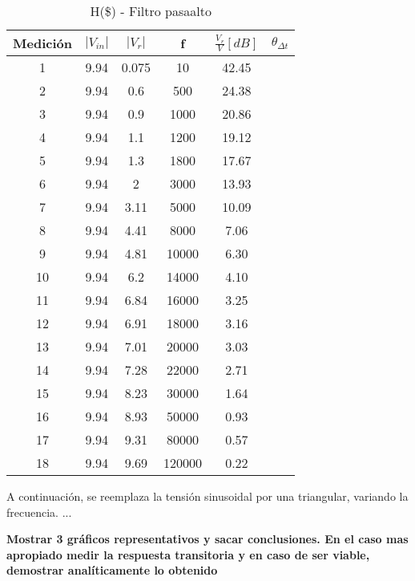 \documentclass[a4paper]{article}
\begin{document}
 \begin{center}
     \begin{table}[H]
     \centering
	   \renewcommand{\arraystretch}{1.1}
     \label{table:Filtro pasaalto}
         \begin{tabular}{c c c c c c }
            \hline 
             Medici\'on  & $|V_{in}|$ &    $|V_r|$ & f&  $\frac{V_r}{V}[dB]$ & $\theta_{\Delta t}$  \\
             \hline
                1	&9.94&	0.075	&10	    &42.45 & \\
                2	&9.94&	0.6	    &500	&24.38 & \\
                3	&9.94&	0.9	    &1000	&20.86 & \\
                4	&9.94&	1.1	    &1200	&19.12 & \\
                5	&9.94&	1.3 	&1800	&17.67 & \\
                6	&9.94&	2	    &3000	&13.93\\
                7	&9.94&	3.11	&5000	&10.09\\
                8	&9.94&	4.41	&8000	&7.06\\
                9	&9.94&	4.81	&10000	&6.30\\
                10	&9.94&	6.2	    &14000	&4.10\\
                11	&9.94&	6.84	&16000	&3.25\\
                12	&9.94&	6.91	&18000	&3.16\\
                13	&9.94&	7.01	&20000	&3.03\\
                14	&9.94&	7.28	&22000	&2.71\\
                15	&9.94&	8.23	&30000	&1.64\\
                16	&9.94&	8.93	&50000	&0.93\\
                17	&9.94&	9.31	&80000	&0.57\\
                18	&9.94&	9.69	&120000	&0.22\\

 \hline
        \end{tabular}
        \caption{H(\$) - Filtro pasaalto}
    \end{table}
\end{center}


A continuación, se reemplaza la tensión sinusoidal por una triangular, variando la frecuencia. ...

\textbf{Mostrar 3 gráficos representativos y sacar conclusiones. En el caso mas apropiado medir la respuesta transitoria y en caso de ser viable, demostrar analíticamente lo obtenido}
\end{document}
